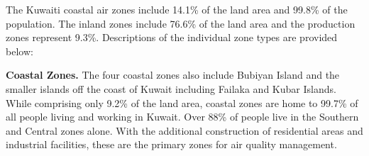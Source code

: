 \begin{sidewaystable}  %
\begin{table}[H]
\centering
\caption{Air Quality Zone Statistics.}
\label{tb:aqzstats}
\end{table}
\end{sidewaystable}

The Kuwaiti coastal air zones include 14.1\% of the land area and 99.8\% of the population.  The inland zones include 76.6\% of the land area and the production zones represent 9.3\%.  Descriptions of the individual zone types are provided below:

\textbf{Coastal Zones.} The four coastal zones also include Bubiyan Island and the smaller islands off the coast of Kuwait including Failaka and Kubar Islands.  While comprising only 9.2\% of the land area, coastal zones are home to 99.7\% of all people living and working in Kuwait. Over 88\% of people live in the Southern and Central zones alone.  With the additional construction of residential areas and industrial facilities, these are the primary zones for air quality management. 

